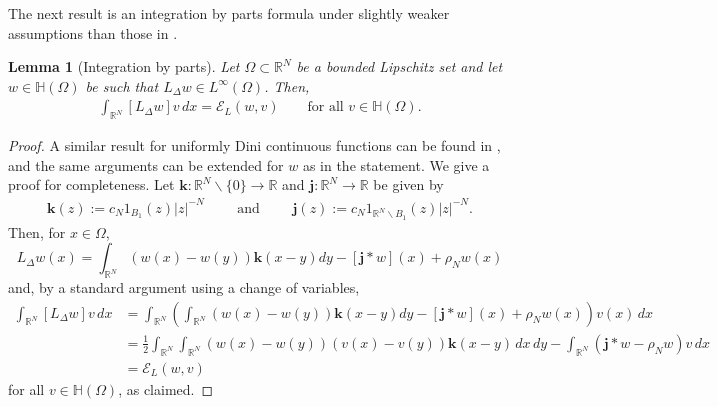 \documentclass[11pt]{article}
\newcommand{\R}{\mathbb{R}}
\numberwithin{equation}{section}
\newtheorem{lemma}[theorem]{Lemma}
\begin{document}
The next result is an integration by parts formula under slightly weaker assumptions than those in \cite[equation (3.11)]{CW19}.
\begin{lemma}[Integration by parts] \label{ibyp:lem} Let $\Omega\subset \R^N$ be a bounded Lipschitz set and let $w\in \mathbb{H}(\Omega)$ be such that $L_{\Delta} w\in L^\infty(\Omega)$. Then,
\begin{align*}
\int_{\mathbb{R}^N}\left[L_{\Delta} w\right] v\, dx=\mathcal{E}_L(w, v)\qquad \text{for all $v \in \mathbb{H}(\Omega)$.}
\end{align*}
\end{lemma}
\begin{proof}
A similar result for uniformly Dini continuous functions can be found in \cite[equation (3.11)]{CW19}, and the same arguments can be extended for $w$ as in the statement. We give a proof for completeness. Let $\mathbf{k}: \mathbb{R}^N \backslash\{0\} \rightarrow \mathbb{R}$ and $\mathbf{j}: \mathbb{R}^N \rightarrow \mathbb{R}$ be given by
\begin{align*}
\mathbf{k}(z):=c_N 1_{B_1}(z)|z|^{-N}\qquad \text{ and }\qquad    \mathbf{j}(z):=c_N 1_{\mathbb{R}^N \backslash B_1}(z)|z|^{-N}.
\end{align*}
Then, for $x\in \Omega$,
$$
L_{\Delta} w(x)=\int_{\mathbb{R}^N}(w(x)-w(y)) \mathbf{k}(x-y) d y-[\mathbf{j} * w](x)+\rho_N w(x)
$$
and, by a standard argument using a change of variables, 
\begin{align*}
\int_{\mathbb{R}^N}\left[L_{\Delta} w\right] v\, dx
&=\int_{\mathbb{R}^N}\left(\int_{\mathbb{R}^N}(w(x)-w(y)) \mathbf{k}(x-y) d y-[\mathbf{j} * w](x)+\rho_N w(x)\right) v(x)\, dx\\
&=\frac{1}{2} \int_{\mathbb{R}^N} \int_{\mathbb{R}^N}(w(x)-w(y))(v(x)-v(y)) \mathbf{k}(x-y) \,dx\, dy-\int_{\mathbb{R}^N}\left(\mathbf{j} * w-\rho_N w\right) v \, dx\\
&=\mathcal{E}_L(w, v)
\end{align*}
for all $v \in \mathbb{H}(\Omega)$, as claimed.
\end{proof}
\end{document}
